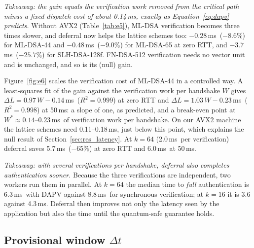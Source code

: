 \documentclass[preprint,10pt,3p]{elsarticle}
\newcommand{\Dt}{\ensuremath{\Delta t}}
\newcommand{\ms}{\,ms}
\begin{document}
\emph{Takeaway: the gain equals the verification work removed from the
critical path minus a fixed dispatch cost of about 0.14\ms, exactly as
Equation~\eqref{eq:dapv} predicts.}  Without AVX2 (Table~\ref{tab:e5}),
ML-DSA verification becomes three times slower, and deferral now helps the
lattice schemes too: $-0.28$\ms\ ($-8.6\%$) for ML-DSA-44 and $-0.48$\ms\
($-9.0\%$) for ML-DSA-65 at zero RTT, and $-3.7$\ms\ ($-25.7\%$) for
SLH-DSA-128f.  FN-DSA-512 verification needs no vector unit and is
unchanged, and so is its (null) gain.

Figure~\ref{fig:e6} scales the verification cost of ML-DSA-44 in a
controlled way.  A least-squares fit of the gain against the verification
work per handshake $W$ gives $\Delta L = 0.97\,W - 0.14$\ms\ ($R^2 =
0.999$) at zero RTT and $\Delta L = 1.03\,W - 0.23$\ms\ ($R^2 = 0.998$) at
50\ms: a slope of one, as predicted, and a break-even point at
$W^\ast \approx 0.14$--$0.23$\ms\ of verification work per handshake.  On
our AVX2 machine the lattice schemes need 0.11--0.18\ms, just below this
point, which explains the null result of Section~\ref{sec:res_latency}.
At $k = 64$ (2.0\ms\ per verification) deferral saves 5.7\ms\ ($-65\%$) at
zero RTT and 6.0\ms\ at 50\ms.

\emph{Takeaway: with several verifications per handshake, deferral also
completes authentication sooner.}  Because the three verifications are
independent, two workers run them in parallel.  At $k = 64$ the median time
to \emph{full} authentication is 6.3\ms\ with DAPV against 8.8\ms\ for
synchronous verification; at $k = 16$ it is 3.6 against 4.3\ms.  Deferral
then improves not only the latency seen by the application but also the
time until the quantum-safe guarantee holds.

\subsection{Provisional window \Dt}
\label{sec:res_delta_t}
\end{document}

